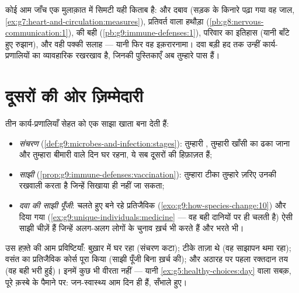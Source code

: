 \begin{example}[जाँच, जीव विज्ञान की तरह पढ़ी हुई]\label{ex:g9:our-responsibility:checkup}
कोई आम जाँच एक मुलाक़ात में सिमटी यही किताब है:  और दबाव (सड़क के
किनारे पढ़ा गया वह जाल,
\cref{ex:g7:heart-and-circulation:measures}), प्रतिवर्त वाला हथौड़ा
(\cref{pb:g8:nervous-communication:1}),  की बही
(\cref{pb:g9:immune-defenses:1}), परिवार का इतिहास (यानी बाँटे हुए
रुझान), और वही पक्की सलाह --- यानी फिर वह इक़रारनामा। दवा बड़ी हद तक उन्हीं
कार्य-प्रणालियों का व्यावहारिक रखरखाव है, जिनकी पुस्तिकाएँ अब तुम्हारे
पास हैं।
\end{example}

\section{दूसरों की ओर ज़िम्मेदारी}

\begin{proposition}[सेहत एक साझी मशीनरी है]\label{prop:g9:our-responsibility:others}
तीन कार्य-प्रणालियाँ सेहत को एक साझा खाता बना देती हैं:
\begin{itemize}
  \item \emph{संचरण}
        (\cref{def:g9:microbes-and-infection:stages}): तुम्हारी
        , तुम्हारी खाँसी का ढका जाना और तुम्हारा बीमारी वाले दिन
        घर रहना, ये सब दूसरों की हिफ़ाज़त हैं;
  \item \emph{साझी }
        (\cref{prop:g9:immune-defenses:vaccination}): तुम्हारा टीका
        तुम्हारे ज़रिए उनकी रखवाली करता है जिन्हें सिखाया ही नहीं जा
        सकता;
  \item \emph{दवा की साझी पूँजी}: चलते हुए बने रहे प्रतिजैविक
        (\cref{exo:g9:how-species-change:10}) और दिया गया 
        (\cref{ex:g9:unique-individuals:medicine} --- वह बही दानियों पर
        ही चलती है) ऐसी साझी चीज़ें हैं जिन्हें अलग-अलग लोगों के चुनाव
        ख़र्च भी करते हैं और भरते भी।
\end{itemize}
\end{proposition}
\admitted

\begin{example}[एक किशोर का साझा खाता]\label{ex:g9:our-responsibility:account}
उस हफ़्ते की आम प्रविष्टियाँ: बुख़ार में घर रहा (संचरण कटा); टीके ताज़ा
थे (वह साझापन थमा रहा); वसंत का प्रतिजैविक कोर्स पूरा किया (साझी पूँजी
बिना ख़र्च की); और अठारह पर पहला रक्तदान तय (वह बही भरी हुई)। इनमें कुछ
भी वीरता नहीं --- यानी \cref{ex:g5:healthy-choices:day} वाला सबक़, पूरे
क़स्बे के पैमाने पर: जन-स्वास्थ्य आम दिन ही हैं, सँभाले हुए।
\end{example}

